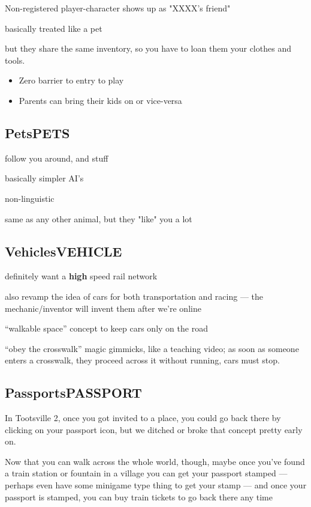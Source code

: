 \documentclass[11pt]{article}
\begin{document}
Non-registered player-character shows up as "XXXX's friend"

basically treated like a pet

but  they share  the same  inventory, so  you have  to loan  them your
clothes and tools.

\begin{itemize}
\item Zero barrier to entry to play
\item Parents can bring their kids on or vice-versa
\end{itemize}
\subsection{Pets\hfill{}\textsc{PETS}}
\label{sec-1-19}

follow you around, and stuff

basically simpler AI's

non-linguistic

same as any other animal, but they "like" you a lot
\subsection{Vehicles\hfill{}\textsc{VEHICLE}}
\label{sec-1-20}

definitely want a  \textbf{high} speed rail network

also revamp the idea of cars for both transportation and racing — the
mechanic/inventor will invent them after we're online

“walkable space” concept to keep cars only on the road

“obey the crosswalk” magic gimmicks, like a teaching video; as soon as
someone enters a crosswalk, they proceed across it without running,
cars must stop.
\subsection{Passports\hfill{}\textsc{PASSPORT}}
\label{sec-1-21}

In Tootsville 2,  once you got invited  to a place, you  could go back
there by clicking on your passport  icon, but we ditched or broke that
concept pretty early on.

Now  that you  can walk  across the  whole world,  though, maybe  once
you've found  a train  station or  fountain in a  village you  can get
your passport stamped  --- perhaps even have some  minigame type thing
to get your stamp  --- and once your passport is  stamped, you can buy
train tickets to go back there any time
\end{document}
